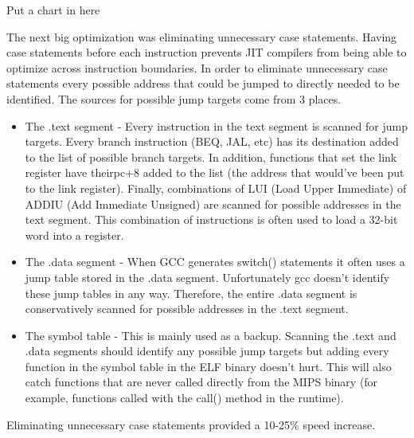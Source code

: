 \documentclass{acmconf}
\begin{document}
Put a chart in here

The next big optimization was eliminating unnecessary case
statements. Having case statements before each instruction prevents
JIT compilers from being able to optimize across instruction
boundaries. In order to eliminate unnecessary case statements every
possible address that could be jumped to directly needed to be
identified. The sources for possible jump targets come from 3 places.

\begin{itemize}

\item The .text segment - Every instruction in the text segment is
      scanned for jump targets. Every branch instruction (BEQ, JAL,
      etc) has its destination added to the list of possible branch
      targets. In addition, functions that set the link register have
      theirpc+8 added to the list (the address that would've been put
      to the link register). Finally, combinations of LUI (Load Upper
      Immediate) of ADDIU (Add Immediate Unsigned) are scanned for
      possible addresses in the text segment. This combination of
      instructions is often used to load a 32-bit word into a
      register.

\item The .data segment - When GCC generates switch() statements it
      often uses a jump table stored in the .data
      segment. Unfortunately gcc doesn't identify these jump tables in
      any way. Therefore, the entire .data segment is conservatively
      scanned for possible addresses in the .text segment.
      
\item The symbol table - This is mainly used as a backup. Scanning the
      .text and .data segments should identify any possible jump
      targets but adding every function in the symbol table in the ELF
      binary doesn't hurt. This will also catch functions that are
      never called directly from the MIPS binary (for example,
      functions called with the call() method in the runtime).

\end{itemize}

Eliminating unnecessary case statements provided a 10-25\% speed
increase.
\end{document}
